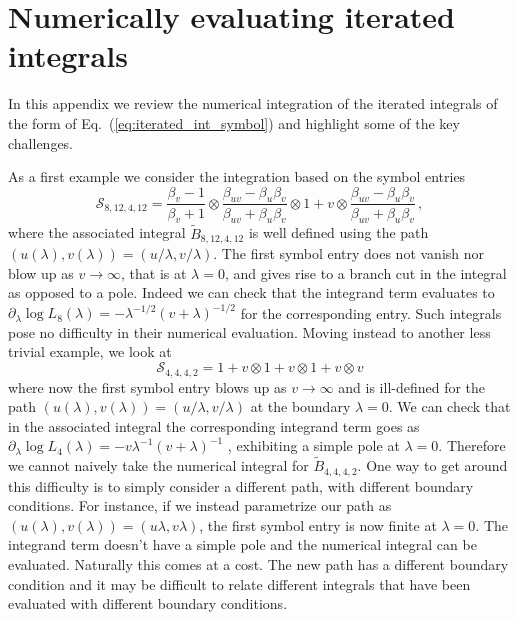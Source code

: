 \documentclass[a4paper,11pt]{article}
\begin{document}
\section{Numerically evaluating iterated integrals}\label{sec:app_iterated_integrals}
In this appendix we review the numerical integration of the iterated integrals of the form of Eq.~(\ref{eq:iterated_int_symbol}) and highlight some of the key challenges. 

As a first example we consider the integration based on the symbol entries 
\begin{equation}\label{eq:symb_8,12,4,12}
    \mathcal{S}_{8,12,4,12} = \frac{\beta _v-1}{\beta _v+1}\otimes\frac{\beta _{uv}-\beta _u \beta _v}{\beta _{uv}+ \beta _u \beta _v}\otimes 1+v\otimes \frac{\beta _{uv}-\beta _u \beta _v}{\beta _{uv}+\beta _u \beta _v} \,,
\end{equation}
where the associated integral $\tilde{B}_{8,12,4,12}$ is well defined using the path $(u(\lambda), v(\lambda))=(u/\lambda, v/\lambda)$. The first symbol entry does not vanish nor blow up as $v\rightarrow \infty$, that is at $\lambda= 0$, and gives rise to a branch cut in the integral as opposed to a pole. Indeed we can check that the integrand term evaluates to $\partial_\lambda \log L_8(\lambda)= - \lambda^{-1/2} (v+\lambda)^{-1/2}$ for the corresponding entry. Such integrals pose no difficulty in their numerical evaluation. Moving instead to another less trivial example, we look at 
\begin{equation}\label{eq:symb_4,4,4,2}
    \mathcal{S}_{4,4,4,2}= 1+v \otimes 1+v \otimes 1+v \otimes v
\end{equation}
where now the first symbol entry blows up as $v\rightarrow \infty$ and is ill-defined for the path $(u(\lambda), v(\lambda))=(u/\lambda, v/\lambda)$ at the boundary $\lambda=0$. We can check that in the associated integral the corresponding integrand term goes as $\partial_\lambda \log L_4(\lambda) = - v \lambda^{-1} (v+\lambda)^{-1}$ , exhibiting a simple pole at $\lambda=0$. Therefore we cannot naively take the numerical integral for $\tilde{B}_{4,4,4,2}$. One way to get around this difficulty is to simply consider a different path, with different boundary conditions. For instance, if we instead parametrize our path as $(u(\lambda), v(\lambda))=(u \lambda, v \lambda)$, the first symbol entry is now finite at $\lambda = 0$. The integrand term doesn't have a simple pole and the numerical integral can be evaluated. Naturally this comes at a cost. The new path has a different boundary condition and it may be difficult to relate different integrals that have been evaluated with different boundary conditions.
\end{document}
